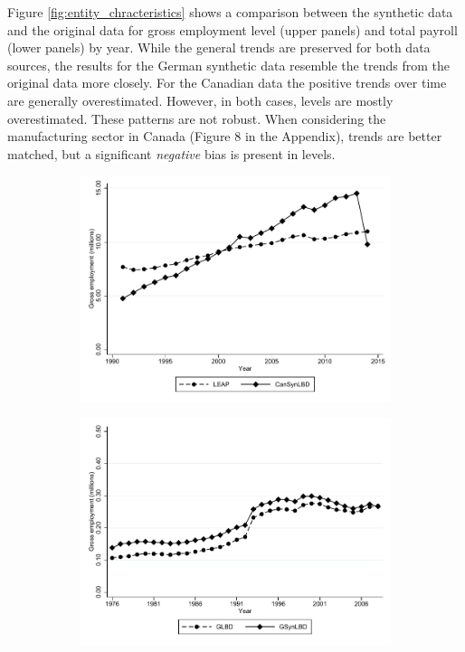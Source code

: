 \documentclass[10pt]{article}
\begin{document}
 
Figure \ref{fig:entity_chracteristics} shows a comparison between the synthetic data and the original data for gross employment level (upper panels) and total payroll (lower panels) by year. While the general trends are preserved for both data sources, the results for the German synthetic data resemble the trends from the original data more closely. For the Canadian data the positive trends over time are generally overestimated. However, in both cases, levels are mostly overestimated. These patterns are not robust. When considering the   manufacturing sector in Canada (Figure 8 %
in the  Appendix), trends are better matched, but a significant \textit{negative} bias is present in levels.
\begin{figure}[t]
  \begin{subfigure}[h]{0.48\linewidth}
    \includegraphics[trim=0 40 0 0,clip, width=\linewidth]{graphs/Gross_employment_level_by_year_private_bw.pdf}
  \end{subfigure}
\hfill
  \begin{subfigure}[h]{0.48\linewidth}
     \includegraphics[trim=0 40 0 0,clip,width=\linewidth]{graphs/Gross_employment_level_by_year_bw_GsynLBD.pdf}

\end{subfigure}
\end{figure}
\end{document}
